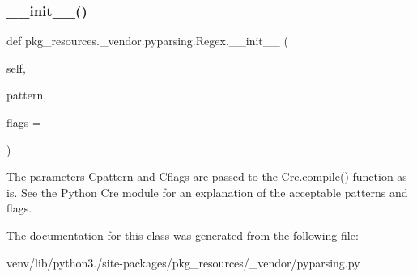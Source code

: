 \subsubsection{\texorpdfstring{\+\_\+\+\_\+init\+\_\+\+\_\+()}{\_\_init\_\_()}}
{\footnotesize\ttfamily def pkg\+\_\+resources.\+\_\+vendor.\+pyparsing.\+Regex.\+\_\+\+\_\+init\+\_\+\+\_\+ (\begin{DoxyParamCaption}\item[{}]{self,  }\item[{}]{pattern,  }\item[{}]{flags = {} }\end{DoxyParamCaption})}

\begin{DoxyVerb}The parameters C{pattern} and C{flags} are passed to the C{re.compile()} function as-is. See the Python C{re} module for an explanation of the acceptable patterns and flags.\end{DoxyVerb}
 

The documentation for this class was generated from the following file\+:\begin{DoxyCompactItemize}
\item 
venv/lib/python3./site-\/packages/pkg\+\_\+resources/\+\_\+vendor/pyparsing.\+py\end{DoxyCompactItemize}
